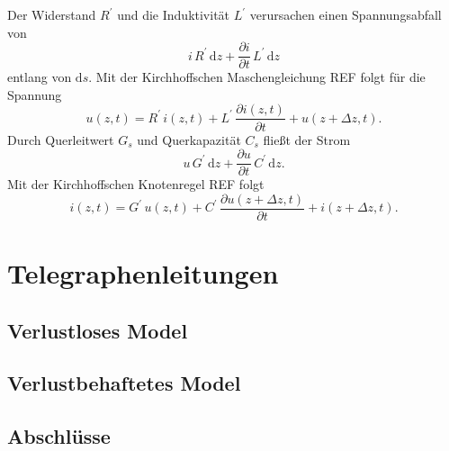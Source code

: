 \documentclass[paper=a4, parskip=half-, ngerman, fontsize=11pt]{scrreprt}
\begin{document}
Der Widerstand $R^{\prime}$ und die Induktivität $L^{\prime}$ verursachen einen Spannungsabfall von
\[
i \, R^{\prime} \, \mathrm{d}z + \frac{\partial i}{\partial t} \, L^{\prime} \, \mathrm{d} z
\]
entlang von $\mathrm{d}s$. Mit der Kirchhoffschen Maschengleichung {\color{red}REF} folgt für die Spannung
\begin{equation}
u(z, t) = R^{\prime} \, i(z, t) + L^{\prime} \, \frac{\partial i(z, t)}{\partial t} + u(z + \Delta z, t).
\end{equation}
Durch Querleitwert $G_{s}$ und Querkapazität $C_{s}$ fließt der Strom
\[
u \, G^{\prime} \, \mathrm{d}z + \frac{\partial u}{\partial t} \, C^{\prime} \, \mathrm{d} z.
\]
Mit der Kirchhoffschen Knotenregel {\color{red}REF} folgt
\begin{equation}
    i(z, t) = G^{\prime} \, u(z, t) + C^{\prime} \, \frac{\partial u(z + \Delta z, t)}{\partial t} + i(z + \Delta z, t).
\end{equation}




\chapter{Telegraphenleitungen}

\section{Verlustloses Model}

\section{Verlustbehaftetes Model}

\section{Abschlüsse}


\printbibliography
\end{document}
